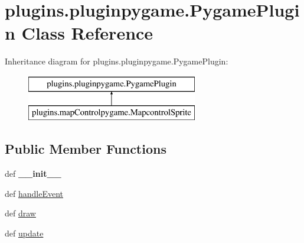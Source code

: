 \hypertarget{classplugins_1_1pluginpygame_1_1_pygame_plugin}{\section{plugins.\-pluginpygame.\-Pygame\-Plugin \-Class \-Reference}
\label{classplugins_1_1pluginpygame_1_1_pygame_plugin}
}
\-Inheritance diagram for plugins.\-pluginpygame.\-Pygame\-Plugin\-:\begin{figure}[H]
\begin{center}
\leavevmode
\includegraphics[height=2.000000cm]{classplugins_1_1pluginpygame_1_1_pygame_plugin}
\end{center}
\end{figure}
\subsection*{\-Public \-Member \-Functions}
\begin{DoxyCompactItemize}
\item 
\hypertarget{classplugins_1_1pluginpygame_1_1_pygame_plugin_a1e37bce5ec01c6957c3388b502ba8267}{def {\bfseries \-\_\-\-\_\-init\-\_\-\-\_\-}}\label{classplugins_1_1pluginpygame_1_1_pygame_plugin_a1e37bce5ec01c6957c3388b502ba8267}

\item 
def \hyperlink{classplugins_1_1pluginpygame_1_1_pygame_plugin_a02ff7850a401e2422f3c2612b8bf7ae8}{handle\-Event}
\item 
def \hyperlink{classplugins_1_1pluginpygame_1_1_pygame_plugin_aadd557776f2e468a83bf05a9d14520d9}{draw}
\item 
def \hyperlink{classplugins_1_1pluginpygame_1_1_pygame_plugin_a3edcae2ee1ee50d1088f728f744dafe1}{update}
\end{DoxyCompactItemize}
